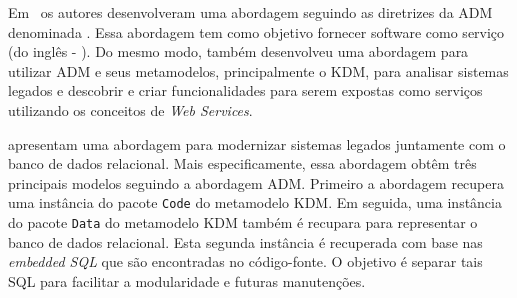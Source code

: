 Em~ os autores desenvolveram uma abordagem seguindo as diretrizes da ADM denominada . Essa abordagem tem como objetivo fornecer software como serviço (do inglês - ). %
Do mesmo modo,  também desenvolveu uma abordagem para utilizar ADM e seus metamodelos, principalmente o KDM, para analisar sistemas legados e descobrir e criar funcionalidades para serem expostas como serviços utilizando os conceitos de \textit{Web Services}.


 apresentam uma abordagem para modernizar sistemas legados juntamente com o banco de dados relacional. Mais especificamente, essa abordagem obtêm três principais modelos seguindo a abordagem ADM. Primeiro a abordagem recupera uma instância do pacote \texttt{Code} do metamodelo KDM. Em seguida, uma instância do pacote \texttt{Data} do metamodelo KDM também é recupara para representar o banco de dados relacional. Esta segunda instância é recuperada com base nas \textit{embedded SQL} que são encontradas no código-fonte. O objetivo é separar tais SQL para facilitar a modularidade e futuras manutenções. 

